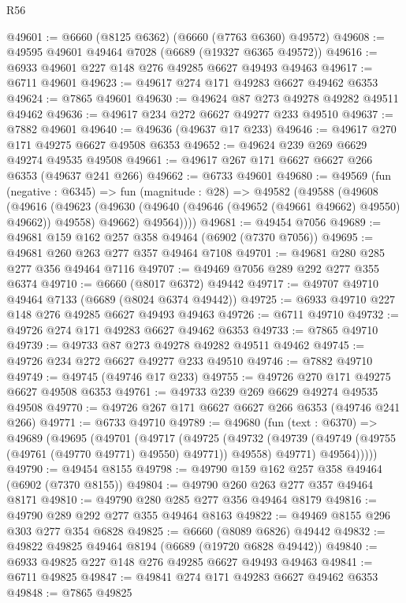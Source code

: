 \begin{lexlean}{R56}
\begin{coremodule}
@49601 := @6660 (@8125 @6362) (@6660 (@7763 @6360) @49572)
@49608 := @49595 @49601 @49464 @7028 (@6689 (@19327 @6365 @49572))
@49616 := @6933 @49601 @227 @148 @276 @49285 @6627 @49493 @49463
@49617 := @6711 @49601
@49623 := @49617 @274 @171 @49283 @6627 @49462 @6353
@49624 := @7865 @49601
@49630 := @49624 @87 @273 @49278 @49282 @49511 @49462
@49636 := @49617 @234 @272 @6627 @49277 @233 @49510
@49637 := @7882 @49601
@49640 := @49636 (@49637 @17 @233)
@49646 := @49617 @270 @171 @49275 @6627 @49508 @6353
@49652 := @49624 @239 @269 @6629 @49274 @49535 @49508
@49661 := @49617 @267 @171 @6627 @6627 @266 @6353 (@49637 @241 @266)
@49662 := @6733 @49601
@49680 := @49569
    (fun (negative : @6345) =>
    fun (magnitude : @28) =>
    @49582
      (@49588
        (@49608
          (@49616
            (@49623 (@49630 (@49640 (@49646 (@49652 (@49661 @49662) @49550) @49662)) @49558) @49662)
            @49564))))
@49681 := @49454 @7056
@49689 := @49681 @159 @162 @257 @358 @49464 (@6902 (@7370 @7056))
@49695 := @49681 @260 @263 @277 @357 @49464 @7108
@49701 := @49681 @280 @285 @277 @356 @49464 @7116
@49707 := @49469 @7056 @289 @292 @277 @355 @6374
@49710 := @6660 (@8017 @6372) @49442
@49717 := @49707 @49710 @49464 @7133 (@6689 (@8024 @6374 @49442))
@49725 := @6933 @49710 @227 @148 @276 @49285 @6627 @49493 @49463
@49726 := @6711 @49710
@49732 := @49726 @274 @171 @49283 @6627 @49462 @6353
@49733 := @7865 @49710
@49739 := @49733 @87 @273 @49278 @49282 @49511 @49462
@49745 := @49726 @234 @272 @6627 @49277 @233 @49510
@49746 := @7882 @49710
@49749 := @49745 (@49746 @17 @233)
@49755 := @49726 @270 @171 @49275 @6627 @49508 @6353
@49761 := @49733 @239 @269 @6629 @49274 @49535 @49508
@49770 := @49726 @267 @171 @6627 @6627 @266 @6353 (@49746 @241 @266)
@49771 := @6733 @49710
@49789 := @49680
    (fun (text : @6370) =>
    @49689
      (@49695
        (@49701
          (@49717
            (@49725
              (@49732
                (@49739 (@49749 (@49755 (@49761 (@49770 @49771) @49550) @49771)) @49558)
                @49771)
              @49564)))))
@49790 := @49454 @8155
@49798 := @49790 @159 @162 @257 @358 @49464 (@6902 (@7370 @8155))
@49804 := @49790 @260 @263 @277 @357 @49464 @8171
@49810 := @49790 @280 @285 @277 @356 @49464 @8179
@49816 := @49790 @289 @292 @277 @355 @49464 @8163
@49822 := @49469 @8155 @296 @303 @277 @354 @6828
@49825 := @6660 (@8089 @6826) @49442
@49832 := @49822 @49825 @49464 @8194 (@6689 (@19720 @6828 @49442))
@49840 := @6933 @49825 @227 @148 @276 @49285 @6627 @49493 @49463
@49841 := @6711 @49825
@49847 := @49841 @274 @171 @49283 @6627 @49462 @6353
@49848 := @7865 @49825

\end{coremodule}
\end{lexlean}
